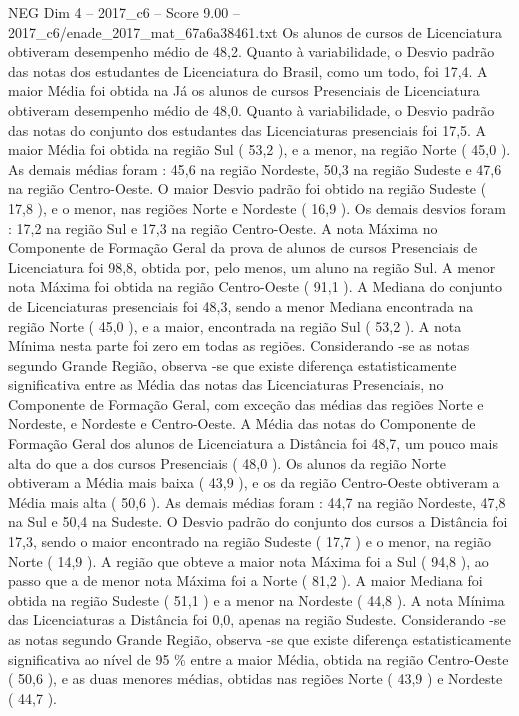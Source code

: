 \begin{textsample}{NEG Dim 4 – 2017\_c6 – Score 9.00 – 2017\_c6/enade\_2017\_mat\_67a6a38461.txt}
Os alunos de cursos de Licenciatura obtiveram desempenho médio de 48,2.
Quanto à variabilidade, o Desvio padrão das notas dos estudantes de Licenciatura do Brasil, como um todo, foi 17,4.
A maior Média foi obtida na Já os alunos de cursos Presenciais de Licenciatura obtiveram desempenho médio de 48,0.
Quanto à variabilidade, o Desvio padrão das notas do conjunto dos estudantes das Licenciaturas presenciais foi 17,5.
A maior Média foi obtida na região Sul ( 53,2 ), e a menor, na região Norte ( 45,0 ).
As demais médias foram : 45,6 na região Nordeste, 50,3 na região Sudeste e 47,6 na região Centro-Oeste.
O maior Desvio padrão foi obtido na região Sudeste ( 17,8 ), e o menor, nas regiões Norte e Nordeste ( 16,9 ).
Os demais desvios foram : 17,2 na região Sul e 17,3 na região Centro-Oeste.
A nota Máxima no Componente de Formação Geral da prova de alunos de cursos Presenciais de Licenciatura foi 98,8, obtida por, pelo menos, um aluno na região Sul.
A menor nota Máxima foi obtida na região Centro-Oeste ( 91,1 ).
A Mediana do conjunto de Licenciaturas presenciais foi 48,3, sendo a menor Mediana encontrada na região Norte ( 45,0 ), e a maior, encontrada na região Sul ( 53,2 ).
A nota Mínima nesta parte foi zero em todas as regiões.
Considerando -se as notas segundo Grande Região, observa -se que existe diferença estatisticamente significativa entre as Média das notas das Licenciaturas Presenciais, no Componente de Formação Geral, com exceção das médias das regiões Norte e Nordeste, e Nordeste e Centro-Oeste.
A Média das notas do Componente de Formação Geral dos alunos de Licenciatura a Distância foi 48,7, um pouco mais alta do que a dos cursos Presenciais ( 48,0 ).
Os alunos da região Norte obtiveram a Média mais baixa ( 43,9 ), e os da região Centro-Oeste obtiveram a Média mais alta ( 50,6 ).
As demais médias foram : 44,7 na região Nordeste, 47,8 na Sul e 50,4 na Sudeste.
O Desvio padrão do conjunto dos cursos a Distância foi 17,3, sendo o maior encontrado na região Sudeste ( 17,7 ) e o menor, na região Norte ( 14,9 ).
A região que obteve a maior nota Máxima foi a Sul ( 94,8 ), ao passo que a de menor nota Máxima foi a Norte ( 81,2 ).
A maior Mediana foi obtida na região Sudeste ( 51,1 ) e a menor na Nordeste ( 44,8 ).
A nota Mínima das Licenciaturas a Distância foi 0,0, apenas na região Sudeste.
Considerando -se as notas segundo Grande Região, observa -se que existe diferença estatisticamente significativa ao nível de 95 \% entre a maior Média, obtida na região Centro-Oeste ( 50,6 ), e as duas menores médias, obtidas nas regiões Norte ( 43,9 ) e Nordeste ( 44,7 ).

\end{textsample}
